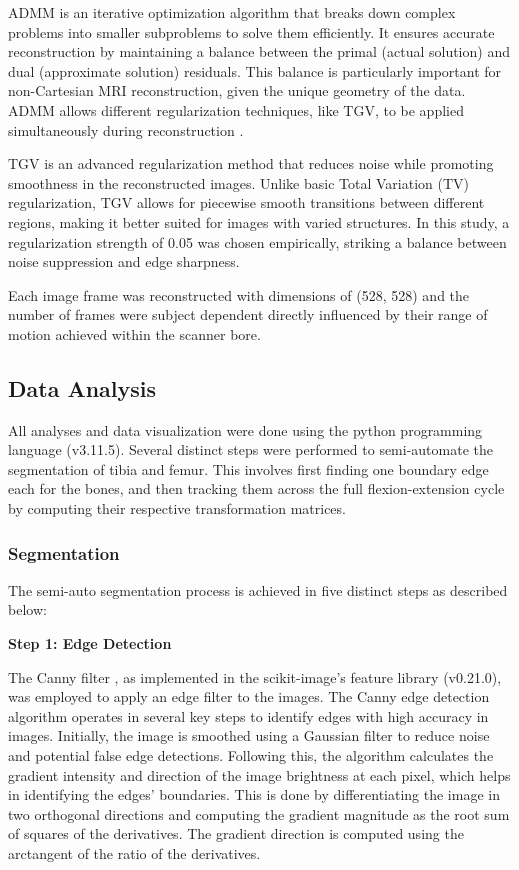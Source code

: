 \documentclass{micro-econ-thesis}
\begin{document}
ADMM is an iterative optimization algorithm that breaks down complex problems into smaller subproblems to solve them efficiently. It ensures accurate reconstruction by maintaining a balance between the primal (actual solution) and dual (approximate solution) residuals. This balance is particularly important for non-Cartesian MRI reconstruction, given the unique geometry of the data. ADMM allows different regularization techniques, like TGV, to be applied simultaneously during reconstruction . 

TGV is an advanced regularization method that reduces noise while promoting smoothness in the reconstructed images. Unlike basic Total Variation (TV) regularization, TGV allows for piecewise smooth transitions between different regions, making it better suited for images with varied structures. In this study, a regularization strength of 0.05 was chosen empirically, striking a balance between noise suppression and edge sharpness.

Each image frame was reconstructed with dimensions of (528, 528) and the number of frames were subject dependent directly influenced by their range of motion achieved within the scanner bore.


\subsection{Data Analysis}
All analyses and data visualization were done using the python programming language (v3.11.5). Several distinct steps were performed to semi-automate the segmentation of tibia and femur. This involves first finding one boundary edge each for the bones, and then tracking them across the full flexion-extension cycle by computing their respective transformation matrices. 
 
\subsubsection{Segmentation}
The semi-auto segmentation process is achieved in five distinct steps as described below: 

\textbf{Step 1: Edge Detection}

The Canny filter \parencite{canny_computational_1986}, as implemented in the scikit-image's feature library (v0.21.0), was employed to apply an edge filter to the images. The Canny edge detection algorithm operates in several key steps to identify edges with high accuracy in images. Initially, the image is smoothed using a Gaussian filter to reduce noise and potential false edge detections. Following this, the algorithm calculates the gradient intensity and direction of the image brightness at each pixel, which helps in identifying the edges' boundaries. This is done by differentiating the image in two orthogonal directions and computing the gradient magnitude as the root sum of
squares of the derivatives. The gradient direction is computed using the arctangent of the ratio of the derivatives.
\end{document}
